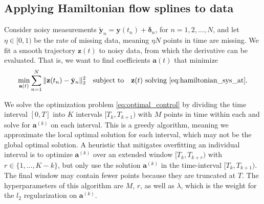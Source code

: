 \documentclass[11pt, a4paper]{article}
\theoremstyle{plain}
\theoremstyle{definition}
\theoremstyle{remark}
\begin{document}
\subsection{Applying Hamiltonian flow splines to data}
\label{sec:optimization}
Consider noisy measurements $\tilde{\mathbf{y}}_n = \mathbf{y}(t_n) + \boldsymbol{\delta}_n$, for $n = 1,2,\dots,N$, and let $\eta \in [0,1)$ be the rate of missing data, meaning $\eta  N$ points in time are missing. We fit a smooth trajectory $\mathbf{z}(t)$ to noisy data, from which the derivative can be evaluated. That is, we want to find coefficients $\mathbf{a}(t)$ that minimize
\begin{equation}
    \begin{aligned}
    \min_{\mathbf{a}(t)}  \sum_{n=1}^N \| \mathbf{z}(t_n) - \tilde{\mathbf{y}}_n \|_2^2 \quad
    \text{subject to} \quad \mathbf{z}(t) \text{ solving }  \eqref{eq:hamiltonian_sys_at}.
\label{eq:optimal_control}
\end{aligned}
\end{equation}

We solve the optimization problem \eqref{eq:optimal_control} by dividing the time interval $[0,T]$ into $K$ intervals $[T_k,T_{k+1})$ with $M$ points in time within each and solve for $\mathbf{a}^{(k)}$ on each interval. This is a greedy algorithm, meaning we approximate the local optimal solution for each interval, which may not be the global optimal solution. A heuristic that mitigates overfitting an individual interval is to  optimize $\mathbf{a}^{(k)}$ over an extended window $[T_{k},T_{k+r})$ with  $r\in\{1,\dots,K-k\}$, but only use the solution $\mathbf{a}^{(k)}$ in the time-interval $[T_{k},T_{k+1})$. The final window may contain fewer points because they are truncated at $T$. The hyperparameters of this algorithm are $M$, $r$, as well as $\lambda$, which is the weight for the $l_2$ regularization on $\mathbf{a}^{(k)}$.
\end{document}
